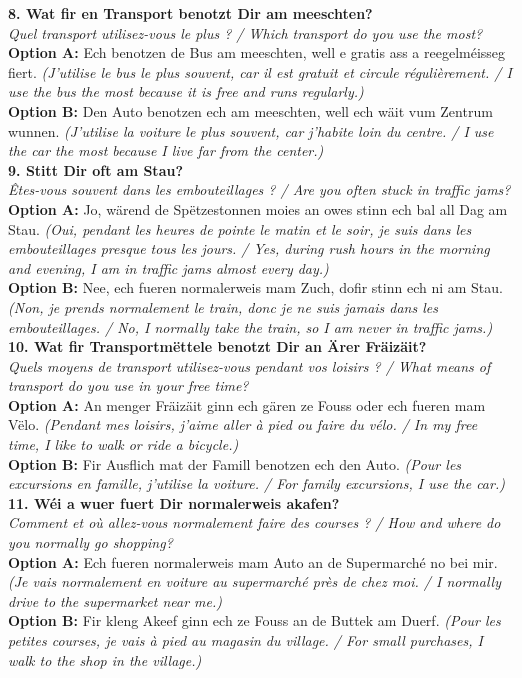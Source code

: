 \noindent\textbf{8. Wat fir en Transport benotzt Dir am meeschten?}\\
\textit{Quel transport utilisez-vous le plus ? / Which transport do you use the most?}\\
\textbf{Option A:} Ech benotzen de Bus am meeschten, well e gratis ass a reegelméisseg fiert. \textit{(J'utilise le bus le plus souvent, car il est gratuit et circule régulièrement. / I use the bus the most because it is free and runs regularly.)}\\
\textbf{Option B:} Den Auto benotzen ech am meeschten, well ech wäit vum Zentrum wunnen. \textit{(J'utilise la voiture le plus souvent, car j'habite loin du centre. / I use the car the most because I live far from the center.)}\\[1em]

\noindent\textbf{9. Stitt Dir oft am Stau?}\\
\textit{Êtes-vous souvent dans les embouteillages ? / Are you often stuck in traffic jams?}\\
\textbf{Option A:} Jo, wärend de Spëtzestonnen moies an owes stinn ech bal all Dag am Stau. \textit{(Oui, pendant les heures de pointe le matin et le soir, je suis dans les embouteillages presque tous les jours. / Yes, during rush hours in the morning and evening, I am in traffic jams almost every day.)}\\
\textbf{Option B:} Nee, ech fueren normalerweis mam Zuch, dofir stinn ech ni am Stau. \textit{(Non, je prends normalement le train, donc je ne suis jamais dans les embouteillages. / No, I normally take the train, so I am never in traffic jams.)}\\[1em]

\noindent\textbf{10. Wat fir Transportmëttele benotzt Dir an Ärer Fräizäit?}\\
\textit{Quels moyens de transport utilisez-vous pendant vos loisirs ? / What means of transport do you use in your free time?}\\
\textbf{Option A:} An menger Fräizäit ginn ech gären ze Fouss oder ech fueren mam Vëlo. \textit{(Pendant mes loisirs, j'aime aller à pied ou faire du vélo. / In my free time, I like to walk or ride a bicycle.)}\\
\textbf{Option B:} Fir Ausflich mat der Famill benotzen ech den Auto. \textit{(Pour les excursions en famille, j'utilise la voiture. / For family excursions, I use the car.)}\\[1em]

\noindent\textbf{11. Wéi a wuer fuert Dir normalerweis akafen?}\\
\textit{Comment et où allez-vous normalement faire des courses ? / How and where do you normally go shopping?}\\
\textbf{Option A:} Ech fueren normalerweis mam Auto an de Supermarché no bei mir. \textit{(Je vais normalement en voiture au supermarché près de chez moi. / I normally drive to the supermarket near me.)}\\
\textbf{Option B:} Fir kleng Akeef ginn ech ze Fouss an de Buttek am Duerf. \textit{(Pour les petites courses, je vais à pied au magasin du village. / For small purchases, I walk to the shop in the village.)}\\[1em]

